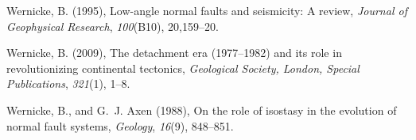\documentclass[twocolumn,grl]{AGUTeX}
\begin{document}
\begin{article}
\begin{thebibliography}{25}
Wernicke, B. (1995), Low-angle normal faults and seismicity: A review,
  \textit{Journal of Geophysical Research}, \textit{100}(B10), 20,159--20.

Wernicke, B. (2009), The detachment era (1977--1982) and its role in
  revolutionizing continental tectonics, \textit{Geological Society, London,
  Special Publications}, \textit{321}(1), 1--8.

Wernicke, B., and G.~J. Axen (1988), On the role of isostasy in the evolution
  of normal fault systems, \textit{Geology}, \textit{16}(9), 848--851.

\end{thebibliography}


\end{article}


%
%
\end{document}
